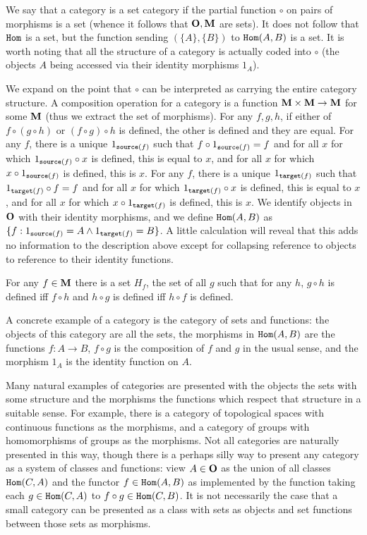 \documentclass[12pt]{article}
\begin{document}
We say that a category is a set category  if the partial function $\circ$  on pairs of morphisms is a set (whence it follows that ${\bf O},{\bf M}$ are sets).  It does not follow
that ${\tt Hom}$ is a set, but the function sending $(\{A\},\{B\})$ to ${\tt Hom}(A,B)$ is a set.  It is worth noting that all the structure of a category is actually coded into $\circ$ (the objects $A$ being accessed via their identity morphisms $1_A$).

We expand on the point that $\circ$ can be interpreted as carrying the entire category structure.  A composition operation for a category is a function ${\bf M} \times {\bf M} \rightarrow {\bf M}$ for some ${\bf M}$ (thus we extract the set of morphisms).  For any $f,g,h$, if either of $f \circ (g \circ h)$ or $(f \circ g) \circ h$ is defined, the other is defined and they are equal.
For any $f$, there is a unique $1_{{\tt source}(f)}$ such that $f \circ 1_{{\tt source}(f)} = f$ and for all $x$ for which $1_{{\tt source}(f)} \circ x$ is defined, this is equal to $x$, and for all $x$ for which $x \circ 1_{{\tt source}(f)}$ is defined, this is $x$.  For any $f$, there is a unique $1_{{\tt target}(f)}$ such that $1_{{\tt target}(f)} \circ f = f$ and for all $x$ for which $1_{{\tt target}(f)} \circ x$ is defined, this is equal to $x$, and for all $x$ for which $x \circ 1_{{\tt target}(f)}$ is defined, this is $x$.   We identify objects in ${\bf O}$ with their identity morphisms, and we define ${\tt Hom}(A,B)$ as $\{f:1_{{\tt source}(f)} = A \wedge 1_{{\tt target}(f)} = B\}$.  A little calculation will reveal that this adds no information to the description above except for collapsing reference to objects to reference to their identity functions.

  For any $f \in {\bf M}$ there is a set $H_f$, the set of all $g$ such that for any $h$, $g \circ h$ is defined iff $f \circ h$
and $h \circ g$ is defined iff $h \circ f$ is defined.

A concrete example of a category is the category of sets and functions:  the objects of this category are all the sets, the morphisms in ${\tt Hom}(A,B)$ are the functions $f:A \rightarrow B$, $f \circ g$ is the composition of $f$ and $g$ in the usual sense, and the morphism $1_A$ is the identity function on $A$.

Many natural examples of categories are presented with the objects the sets with some structure and the morphisms the functions which respect that structure in a suitable sense.  For example, there is a category of topological spaces with continuous functions as the morphisms, and a category of groups with homomorphisms of groups as the morphisms.
Not all categories are naturally  presented in this way, though there is a perhaps silly way to present any category as a system of classes and functions:  view $A \in {\bf O}$ as the union of all classes ${\tt Hom}(C,A)$ and the functor $f \in {\tt Hom}(A,B)$ as implemented by the function taking each $g \in {\tt Hom}(C,A)$ to $f \circ g \in {\tt Hom}(C,B)$.
It is not necessarily the case that a small category can be presented as a class with sets as objects and set functions between those sets as morphisms.
\end{document}
